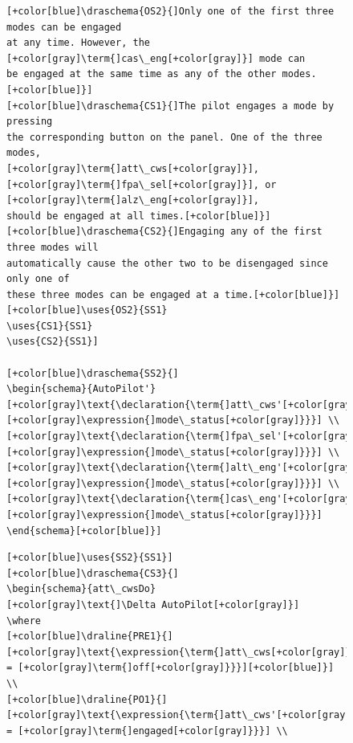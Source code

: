 \begin{figure}[H]
\begin{minipage}{0.45\textwidth}
\begin{tiny}
\begin{BVerbatim}[commandchars=+\[\]]
[+color[blue]\draschema{OS2}{]Only one of the first three modes can be engaged
at any time. However, the [+color[gray]\term{]cas\_eng[+color[gray]}] mode can 
be engaged at the same time as any of the other modes.[+color[blue]}]
[+color[blue]\draschema{CS1}{]The pilot engages a mode by pressing
the corresponding button on the panel. One of the three modes, 
[+color[gray]\term{]att\_cws[+color[gray]}], [+color[gray]\term{]fpa\_sel[+color[gray]}], or [+color[gray]\term{]alz\_eng[+color[gray]}],
should be engaged at all times.[+color[blue]}]
[+color[blue]\draschema{CS2}{]Engaging any of the first three modes will 
automatically cause the other two to be disengaged since only one of 
these three modes can be engaged at a time.[+color[blue]}] 
[+color[blue]\uses{OS2}{SS1}
\uses{CS1}{SS1}
\uses{CS2}{SS1}]
 
[+color[blue]\draschema{SS2}{]
\begin{schema}{AutoPilot'}
[+color[gray]\text{\declaration{\term{]att\_cws'[+color[gray]}]: [+color[gray]\expression{]mode\_status[+color[gray]}}}] \\
[+color[gray]\text{\declaration{\term{]fpa\_sel'[+color[gray]}]: [+color[gray]\expression{]mode\_status[+color[gray]}}}] \\
[+color[gray]\text{\declaration{\term{]alt\_eng'[+color[gray]}]: [+color[gray]\expression{]mode\_status[+color[gray]}}}] \\
[+color[gray]\text{\declaration{\term{]cas\_eng'[+color[gray]}]: [+color[gray]\expression{]mode\_status[+color[gray]}}}] 
\end{schema}[+color[blue]}]
\end{BVerbatim}
\end{tiny}
 \end{minipage}\hfill
\begin{minipage}{0.45\textwidth}
\centering
\begin{tiny}
\begin{BVerbatim}[commandchars=+\[\]]
[+color[blue]\uses{SS2}{SS1}]
[+color[blue]\draschema{CS3}{]
\begin{schema}{att\_cwsDo}
[+color[gray]\text{]\Delta AutoPilot[+color[gray]}]
\where
[+color[blue]\draline{PRE1}{]
[+color[gray]\text{\expression{\term{]att\_cws[+color[gray]}] = [+color[gray]\term{]off[+color[gray]}}}][+color[blue]}] \\
[+color[blue]\draline{PO1}{]
[+color[gray]\text{\expression{\term{]att\_cws'[+color[gray]}] = [+color[gray]\term{]engaged[+color[gray]}}}] \\

\end{BVerbatim}
\end{tiny}
\end{minipage}
\end{figure}
